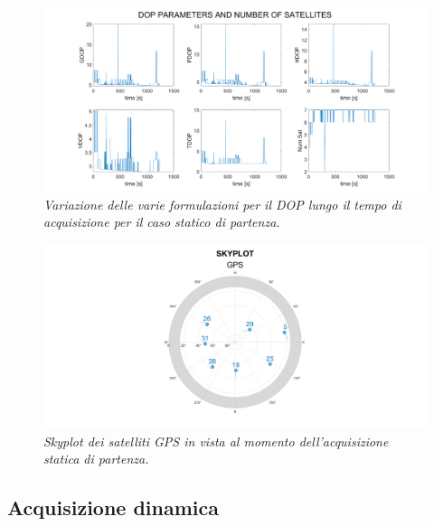 \documentclass[a4paper,11pt,twoside]{book}
\begin{document}
	\vspace{-0.5cm}

	\begin{figure}[H]
		\centering
		\includegraphics[scale=0.25]{"Immagini workbook/Immagini esp3/stat13"}
		\caption{\textit{Variazione delle varie formulazioni per il DOP lungo il tempo di acquisizione per il caso statico di partenza.}}
		\label{fig:stat13}
	\end{figure}

	\vspace{-0.5cm}


		\begin{figure}[H]
		\centering
		\includegraphics[scale=0.25]{"Immagini workbook/Immagini esp3/stat15"}
		\caption{\textit{Skyplot dei satelliti GPS in vista al momento dell'acquisizione statica di partenza.}}
		\label{fig:stat15}
	\end{figure}

	\subsection{Acquisizione dinamica}
	
\end{document}
